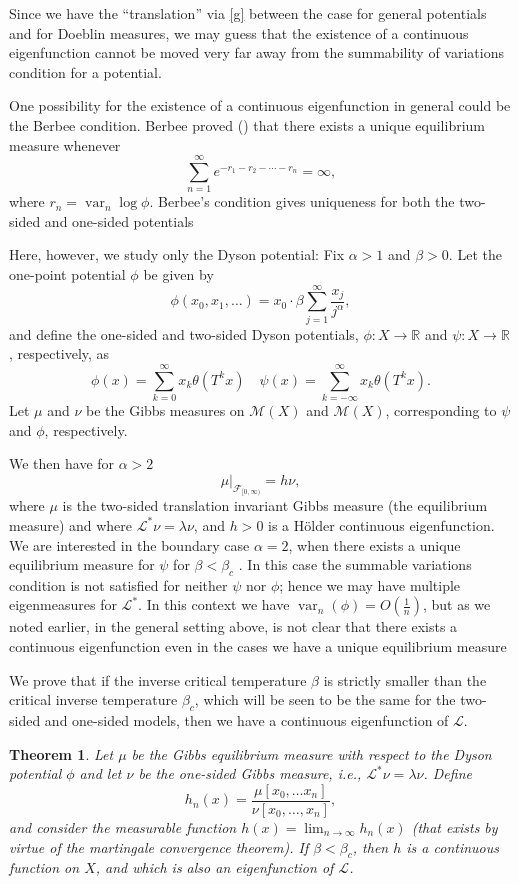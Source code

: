 \documentclass[11pt, a4paper]{amsart}
\newtheorem{thm}{Theorem}
\theoremstyle{definition}
\theoremstyle{remark}
\providecommand{\RR}{\mathbb{R}}
\providecommand{\CM}{\mathscr{M}}
\providecommand{\opn}{\operatorname}
\providecommand{\var}{\opn{var}}
\def\X{X}
\begin{document}
Since we have the ``translation'' via \eqref{g} between the case for general potentials and for Doeblin measures, we may guess that the existence of a continuous eigenfunction cannot be moved very far away from the summability of variations condition for a potential.

One possibility for the existence of a continuous eigenfunction in general could be the Berbee condition.
Berbee proved (\cite{berbee89}) that there exists a
unique equilibrium measure whenever
\begin{equation}\label{berbee}
  \sum_{n=1}^\infty e^{-r_1-r_2-\cdots-r_n}=\infty,    
\end{equation}
where $r_n=\var_n \log \phi$. Berbee's condition
gives uniqueness for both the two-sided and
one-sided potentials

Here, however, we study only the Dyson potential: Fix $\alpha>1$ and $\beta>0$. Let the one-point potential $\phi$ be given by
$$\phi(x_0, x_1,\ldots)=x_0\cdot \beta \sum_{j=1}^\infty \frac{x_j}{j^\alpha},$$
and define the one-sided and two-sided 
Dyson potentials, $\phi:\X\to \RR$ and $\psi:\X\to\RR$, respectively, as
$$
\phi(x)=\sum_{k=0}^\infty x_k \theta (T^k x) \quad
\psi(x)=\sum_{k=-\infty}^\infty x_k \theta(T^k x).
$$
Let $\mu$ and $\nu$ be the Gibbs measures on $\CM(\X)$ and $\CM(\X)$, corresponding to $\psi$ and $\phi$, respectively.

We then have for $\alpha>2$
$$\mu\vert_{{\mathcal F}_{[0,\infty)}}= h\nu,$$
where $\mu$ is the two-sided translation invariant Gibbs measure (the
equilibrium measure) and where ${\mathcal L}^*\nu=\lambda \nu$, and $h>0$ is a
H\"older continuous eigenfunction. We are interested in the boundary case
$\alpha=2$, when there exists a unique equilibrium measure for $\psi$ for
$\beta<\beta_c$ \cite{ACCN}. In this case the summable variations condition is not satisfied
for neither $\psi$ nor $\phi$; hence we may have multiple eigenmeasures for
${\mathcal L}^*$. In this context we have $\var_n(\phi)=O(\frac{1}{n})$, but as we noted earlier, in the general setting above, is not clear that there exists a continuous eigenfunction even in the cases we have a unique
equilibrium measure

We prove that if the inverse critical temperature $\beta$ is strictly smaller than the critical inverse temperature $\beta_c$, which will be seen to be the same for the two-sided and one-sided models, then we have a continuous eigenfunction of ${\mathcal L}$.

\begin{thm}\label{main} Let $\mu$ be the Gibbs equilibrium measure with respect
to the Dyson potential $\phi$ and let $\nu$ be the one-sided Gibbs measure,
i.e., ${\mathcal L}^*\nu=\lambda \nu$. Define
$$h_n(x)=\frac{\mu[x_0,\ldots x_n]}{\nu[x_0,\ldots, x_n]},$$
and consider the measurable function $h(x)=\lim_{n\to \infty}h_n(x)$ (that exists by virtue of the martingale convergence theorem). If $\beta<\beta_c$, then $h$ is a continuous function on $\X$, and which is also
an eigenfunction of ${\mathcal L}$.
\end{thm}
\end{document}
